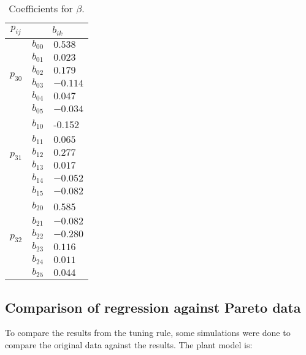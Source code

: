 %
\begin{table}[tb]
	\centering
	\caption{Coefficients for $\beta$.}
	\label{T:beta}
	\begin{tabular}{@{}cll}
		\hline
		$p_{ij}$                  & \multicolumn{2}{c}{$b_{ik}$}  \\
		\hline
		\multirow{6}{*}{$p_{30}$} & $b_{00}$  & $0.538$
		
		\\ %
		& $b_{01}$      & $0.023$     \\ %
		& $b_{02}$      & $0.179$   	\\ %
		& $b_{03}$      & $-0.114$    \\ %
		& $b_{04}$      & $0.047$   	  \\ %
		& $b_{05}$      & $-0.034$   \\ \hline
		\multirow{6}{*}{$p_{31}$} & $b_{10}$  & -0.152
		\\ %
		& $b_{11}$      & $0.065$    \\ %
		& $b_{12}$      & $0.277$      \\ %
		& $b_{13}$      & $0.017$      \\ %
		& $b_{14}$      & $-0.052$   \\ %
		& $b_{15}$      & $-0.082$     \\ \hline
		
		\multirow{6}{*}{$p_{32}$} & $b_{20}$  & 0.585
		\\ %
		& $b_{21}$      & $-0.082$    \\ %
		& $b_{22}$      & $-0.280$      \\ %
		& $b_{23}$      & $0.116$      \\ %
		& $b_{24}$      & $0.011$   \\ %
		& $b_{25}$      & $0.044$     \\ \hline
	\end{tabular}
\end{table}
%
\subsection{Comparison of regression against Pareto data}
%
To compare the results from the tuning rule, some simulations were done to compare the original data against the results. The plant model is: 

